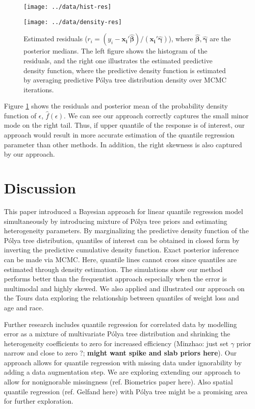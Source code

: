 \documentclass[12pt]{article}
\newcommand{\polya}{P\'{o}lya}
\begin{document}
\begin{figure}[htbp]
  \begin{minipage}{0.5\linewidth}
    \centerline{\texttt{[image: ../data/hist-res]}}
  \end{minipage}
  \begin{minipage}{0.5\linewidth}
    \centerline{\texttt{[image: ../data/density-res]}}
  \end{minipage}
  \caption[]{\label{fig:tourpost} Estimated residuals ($r_i = (y_i-
    \bm{x_i'\hat{\beta}})/(\bm{x_i'\hat{\gamma}})$), where
    $\hat{\bm{\beta}}, \hat{\bm{\gamma}}$ are the posterior medians. The left
    figure shows the histogram of the residuals, and the right one
    illustrates the estimated predictive density function, where the
    predictive density function is estimated by averaging predictive
    \polya{} tree distribution density over MCMC iterations.} 
\end{figure}

Figure \ref{fig:tourpost} shows the residuals and posterior mean of the
probability density function of $\epsilon$, $\hat{f}(\epsilon)$. We
can see our approach correctly captures the small minor mode on
the right tail. Thus, if upper quantile of the response is of interest, our
approach would result in more accurate estimation of the quantile regression
parameter than other methods. In addition, the right skewness is also
captured by our approach.

\section{Discussion}
This paper introduced a Bayesian approach for linear quantile regression
model simultaneously by introducing mixture of \polya{} tree
priors and estimating heterogeneity parameters. By marginalizing the
predictive density function of the \polya{} tree distribution, quantiles
of interest can be obtained in closed form by inverting the predictive cumulative
density function. Exact posterior inference can be made via
MCMC. Here, quantile lines cannot cross since 
quantiles are estimated through density estimation. 
The simulations show our method performs better than the frequentist
approach especially when the error is multimodal and highly skewed. We
also applied and illustrated our approach on the Tours data exploring
the relationship between  quantiles of weight loss and age
and race. 

Further research includes quantile regression for correlated data by
modelling error as a mixture of multivariate \polya{} tree
distribution and 
shrinking the heterogeneity coefficients to zero for increased
efficiency  (Minzhao: just set
$\gamma$ prior narrow and  close to zero ?; {\bf might want spike and
  slab priors here}).  Our approach allows for
quantile
regression with missing data under ignorability by adding a data
augmentation step.  We are exploring extending our approach to allow
for nonignorable missingness (ref. Biometrics paper here).
Also spatial quantile regression (ref. Gelfand here) with \polya{} tree might be
a promising area for further exploration. 


% 

\end{document}
